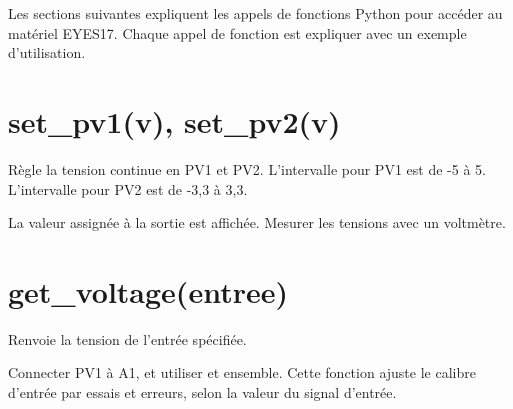 \documentclass[a4paper,12pt,french]{sphinxmanual}
\begin{document}
Les sections suivantes expliquent les appels de fonctions Python pour
accéder au matériel EYES17. Chaque appel de fonction est expliquer
avec un exemple d’utilisation.


\section{set\_pv1(v), set\_pv2(v)}
\label{\detokenize{9.0:set-pv1-v-set-pv2-v}}
Règle la tension continue en PV1 et PV2. L’intervalle pour PV1 est
de -5 à 5. L’intervalle pour PV2 est de -3,3 à 3,3.

\begin{sphinxVerbatim}[commandchars=\\\{\}]
 
 
\end{sphinxVerbatim}

La valeur assignée à la sortie est affichée. Mesurer les tensions
avec un voltmètre.


\section{get\_voltage(entree)}
\label{\detokenize{9.0:get-voltage-entree}}
Renvoie la tension de l’entrée spécifiée.

\begin{sphinxVerbatim}[commandchars=\\\{\}]
 
 
 
 
 
\end{sphinxVerbatim}

Connecter PV1 à A1, et utiliser  et 
ensemble. Cette fonction ajuste le calibre d’entrée par essais et
erreurs, selon la valeur du signal d’entrée.
\end{document}
